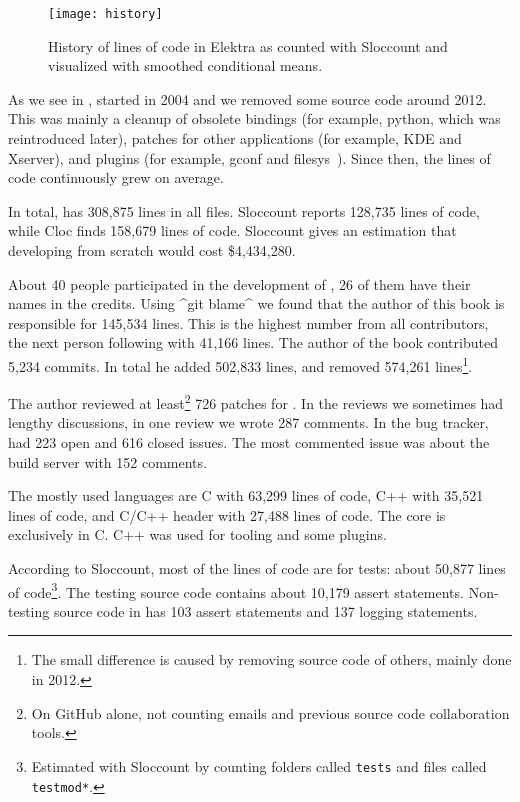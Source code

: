 \begin{code}[language=Cpp,firstnumber=19]
\begin{figure}[htp]
\centering
\hspace*{-0.3cm}\texttt{[image: history]}
\caption[History of lines of code in Elektra.]{History of lines of code in Elektra as counted with Sloccount and visualized with smoothed conditional means.
}
\label{fig:elektra-history}
\end{figure}

As we see in , \elektra{} started in 2004 and we removed some source code around 2012.
This was mainly a cleanup of obsolete bindings (for example, python, which was reintroduced later), patches for other applications (for example, KDE and Xserver), and plugins (for example, gconf and filesys~\cite{raab2010thesis}).
Since then, the lines of code continuously grew on average.


In total, \elektra{} has 308,875 lines in all files.
Sloccount reports 128,735 lines of code, while Cloc finds 158,679 lines of code.
Sloccount gives an estimation that developing \elektra{} from scratch would cost \$4,434,280.

About 40 people participated in the development of \elektra{}, 26 of them have their names in the credits.
Using ^git blame^ we found that the author of this book is responsible for 145,534 lines.
This is the highest number from all contributors, the next person following with 41,166 lines.
The author of the book contributed 5,234 commits. %
In total he added 502,833 lines, and removed 574,261 lines\footnote{The small difference is caused by removing source code of others, mainly done in 2012.}.

The author reviewed at least\footnote{On GitHub alone, not counting emails and previous source code collaboration tools.} 726 patches for \elektra{}.
In the reviews we sometimes had lengthy discussions, in one review we wrote 287 comments.
In the bug tracker, \elektra{} had 223 open and 616 closed issues.
The most commented issue was about the build server with 152 comments.

The mostly used languages are
C with 63,299 lines of code,
C++ with 35,521 lines of code, and
C/C++ header with 27,488 lines of code.
The core is exclusively in C.
C++ was used for tooling and some plugins.

According to Sloccount, most of the lines of code are for tests:
about 50,877 lines of code\footnote{Estimated with Sloccount by counting folders called \texttt{tests} and files called \texttt{testmod*}.}.
The testing source code contains about 10,179 assert statements.
Non-testing source code in  has 103 assert statements and 137 logging statements.


\end{code}
